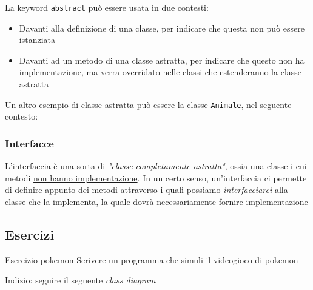 \vskip3mm
La keyword \verb|abstract| può essere usata in due contesti:
\begin{itemize}
	\item Davanti alla definizione di una classe, per indicare che questa non può essere istanziata
	\item Davanti ad un metodo di una classe astratta, per indicare che questo non ha implementazione, ma verra overridato nelle classi che estenderanno la classe astratta
\end{itemize}

Un altro esempio di classe astratta può essere la classe \verb|Animale|, nel seguente contesto:
\begin{center}
\end{center}
\subsubsection{Interfacce}
L'interfaccia è una sorta di \textit{"classe completamente astratta"}, ossia una classe i cui metodi \underline{non hanno implementazione}. In un certo senso, un'interfaccia ci permette di definire appunto dei metodi attraverso i quali possiamo \textit{interfacciarci} alla classe che la \underline{implementa}, la quale dovrà necessariamente fornire implementazione

\subsection{Esercizi}
\begin{esercizio}{Esercizio pokemon}
	Scrivere un programma che simuli il videogioco di pokemon

\end{esercizio}
Indizio: seguire il seguente \textit{class diagram}

